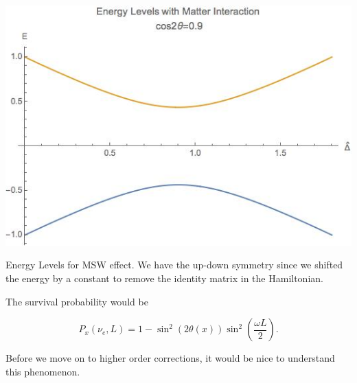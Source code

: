 \documentclass{tufte-handout}
\begin{document}
\begin{marginfigure}
\includegraphics{assets/mswEnergyLevels}
\caption{Energy Levels for MSW effect. We have the up-down symmetry since we shifted the energy by a constant to remove the identity matrix in the Hamiltonian.}
\end{marginfigure}


The survival probability would be

\begin{equation*}
P_x(\nu_e,L) = 1 - \sin^2(2\theta (x))\sin^2\left( \frac{\omega L}{2} \right) .
\end{equation*}


Before we move on to higher order corrections, it would be nice to understand this phenomenon.
\end{document}
